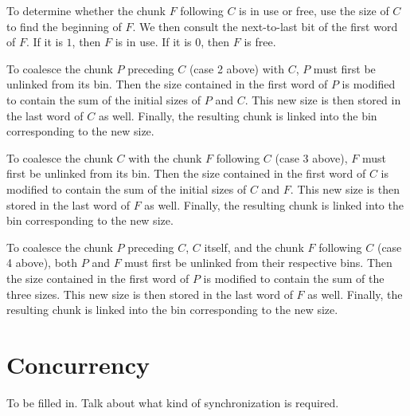 To determine whether the chunk $F$ following $C$ is in use or free,
use the size of $C$ to find the beginning of $F$.  We then consult the
next-to-last bit of the first word of $F$.  If it is $1$, then $F$ is
in use.  If it is $0$, then $F$ is free.

To coalesce the chunk $P$ preceding $C$ (case 2 above) with $C$, $P$
must first be unlinked from its bin.  Then the size contained in the
first word of $P$ is modified to contain the sum of the initial sizes
of $P$ and $C$.  This new size is then stored in the last word of $C$
as well.  Finally, the resulting chunk is linked into the bin
corresponding to the new size.

To coalesce the chunk $C$ with the chunk $F$ following $C$ (case 3
above), $F$ must first be unlinked from its bin.  Then the size
contained in the first word of $C$ is modified to contain the sum of
the initial sizes of $C$ and $F$.  This new size is then stored in the
last word of $F$ as well.  Finally, the resulting chunk is linked into
the bin corresponding to the new size.

To coalesce the chunk $P$ preceding $C$, $C$ itself, and the chunk $F$
following $C$ (case 4 above), both $P$ and $F$ must first be unlinked
from their respective bins.  Then the size contained in the first word
of $P$ is modified to contain the sum of the three sizes.  This new
size is then stored in the last word of $F$ as well.  Finally, the
resulting chunk is linked into the bin corresponding to the new size.

\section{Concurrency}

To be filled in.  Talk about what kind of synchronization is required.

